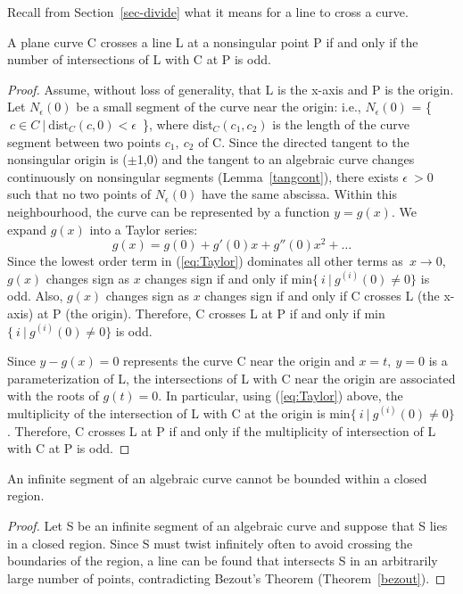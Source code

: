 Recall from Section~\ref{sec-divide} what it means for a line to cross
a curve.
\begin{lemma}
\label{planarcutsthru}
A plane curve C crosses a line L at a nonsingular point P
if and only if the number of intersections of L with C at P is odd.
\end{lemma}
%
\begin{proof}
Assume, without loss of generality, that L
is the x-axis and P is the origin.
Let $N_{\epsilon}(0)$ be a small segment of the curve near the
origin: i.e., $N_{\epsilon}(0)$ = \{$\ c\in C\ |\ $dist$_{C}(c,0) < \epsilon$\ \},
where dist$_{C}(c_{1},c_{2})$ is the length of the curve segment between
two points $c_{1},\ c_{2}$ of C.
Since the directed tangent to the nonsingular origin is ($\pm$1,0)
and the tangent to an algebraic curve
changes continuously on nonsingular segments (Lemma~\ref{tangcont}),
there exists $\epsilon\ > 0$ such that no two points of
$N_{\epsilon}(0)$ have the same abscissa.
Within this neighbourhood, 
the curve can be represented by a function \mbox{$y = g(x)$}.
We expand $g(x)$ into a Taylor series:
\begin{equation}
\label{eq:Taylor}
g(x) = g(0) + g'(0)x + g''(0)x^2 + \ldots  
\end{equation}
Since the lowest order term in (\ref{eq:Taylor})
dominates all other terms \mbox{as $x \rightarrow 0$},
$g(x)$ changes sign as $x$ changes sign if and only if
\mbox{min$\{\ i\ |\ g^{(i)}(0) \neq 0\}$} is odd.
Also, $g(x)$ changes sign as $x$ changes sign if and only if
C crosses L (the x-axis) at P (the origin).
Therefore, C crosses L at P if and only if
\mbox{min$\{\ i\ |\ g^{(i)}(0) \neq 0\}$} is odd.

Since $y-g(x) = 0$ represents the curve C near the origin
and \mbox{$x=t,\ y=0$} is a parameterization of L, the intersections of L
with C near the origin are associated with the roots of $g(t)=0$.
In particular, using (\ref{eq:Taylor}) above, the
multiplicity of the intersection of L with C at the origin is
\mbox{min$\{\ i\ |\ g^{(i)}(0) \neq 0\}$}.
Therefore, C crosses L at P if and only if the multiplicity
of intersection of L with C at P is odd.
\end{proof}
%
\begin{lemma}
\label{nonbounded}
An infinite segment of an algebraic curve cannot be bounded within a
closed region.
\end{lemma}
%
\begin{proof}
Let S be an infinite segment of an algebraic curve and
suppose that S lies in a closed region.
Since S must twist infinitely often to avoid crossing the boundaries
of the region,
a line can be found that intersects S in an arbitrarily large
number of points, contradicting Bezout's Theorem (Theorem~\ref{bezout}).
\end{proof}
